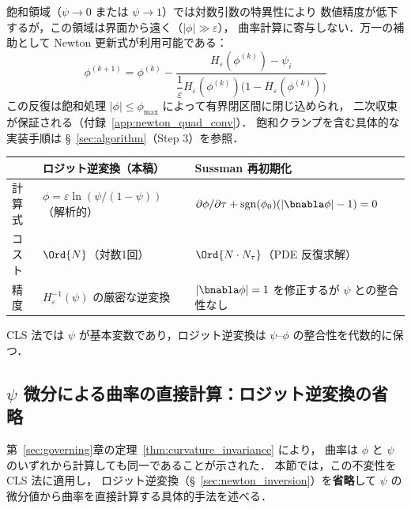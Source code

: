 飽和領域（$\psi \to 0$ または $\psi \to 1$）では対数引数の特異性により
数値精度が低下するが，この領域は界面から遠く（$|\phi| \gg \varepsilon$），
曲率計算に寄与しない．万一の補助として Newton 更新式が利用可能である：
\begin{equation}
  \phi^{(k+1)} = \phi^{(k)} - \frac{H_\varepsilon(\phi^{(k)}) - \psi_i}{\dfrac{1}{\varepsilon}H_\varepsilon(\phi^{(k)})\bigl(1-H_\varepsilon(\phi^{(k)})\bigr)}
  \label{eq:newton_inversion}
\end{equation}
この反復は飽和処理 $|\phi| \le \phi_{\max}$ によって有界閉区間に閉じ込められ，
二次収束が保証される（付録~\ref{app:newton_quad_conv}）．
飽和クランプを含む具体的な実装手順は §~\ref{sec:algorithm}（Step 3）を参照．

\begin{tcolorbox}[mybox, title={ロジット逆変換 vs. Sussman 再初期化}]
\begin{center}
\renewcommand{\arraystretch}{1.3}
\begin{tabular}{lll}
\hline
 & \textbf{ロジット逆変換（本稿）} & \textbf{Sussman 再初期化} \\
\hline
計算式 & $\phi = \varepsilon\ln(\psi/(1-\psi))$（解析的） & $\partial\phi/\partial\tau + \mathrm{sgn}(\phi_0)(|\bnabla\phi|-1)=0$ \\
コスト & $\Ord{N}$（対数1回） & $\Ord{N \cdot N_\tau}$（PDE 反復求解） \\
精度 & $H_\varepsilon^{-1}(\psi)$ の厳密な逆変換 & $|\bnabla\phi|=1$ を修正するが $\psi$ との整合性なし \\
\hline
\end{tabular}
\end{center}
CLS 法では $\psi$ が基本変数であり，ロジット逆変換は $\psi$--$\phi$ の整合性を代数的に保つ．
\end{tcolorbox}

\subsection{\texorpdfstring{$\psi$}{ψ} 微分による曲率の直接計算：ロジット逆変換の省略}
\label{sec:curvature_direct_psi_cls}

第~\ref{sec:governing}章の定理~\ref{thm:curvature_invariance} により，
曲率は $\phi$ と $\psi$ のいずれから計算しても同一であることが示された．
本節では，この不変性を CLS 法に適用し，
ロジット逆変換（§~\ref{sec:newton_inversion}）を\textbf{省略}して
$\psi$ の微分値から曲率を直接計算する具体的手法を述べる．


